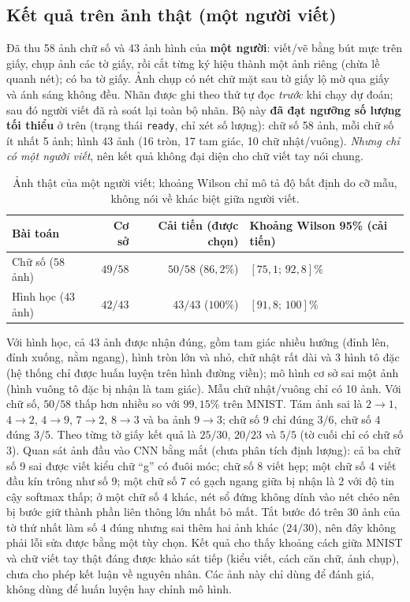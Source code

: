 \subsection{Kết quả trên ảnh thật (một người viết)}
Đã thu 58 ảnh chữ số và 43 ảnh hình của \textbf{một người}: viết/vẽ bằng bút mực trên giấy, chụp ảnh các tờ giấy, rồi cắt từng ký hiệu thành một ảnh riêng
(chừa lề quanh nét); có ba tờ giấy. Ảnh chụp có nét chữ mặt sau tờ giấy lộ mờ qua giấy và ánh sáng không đều. Nhãn được ghi theo thứ tự đọc \emph{trước} khi chạy dự đoán; sau đó người viết đã rà soát lại toàn bộ nhãn.
Bộ này \textbf{đã đạt ngưỡng số lượng tối thiểu} ở trên (trạng thái \texttt{ready}, chỉ xét số lượng): chữ số 58 ảnh, mỗi chữ số ít nhất 5 ảnh; hình 43 ảnh (16 tròn, 17 tam giác, 10 chữ nhật/vuông).
\emph{Nhưng chỉ có một người viết}, nên kết quả không đại diện cho chữ viết tay nói chung.

\begin{table}[H]\centering
\begin{tabular}{lrrl}
\toprule
Bài toán & Cơ sở & Cải tiến (được chọn) & Khoảng Wilson 95\% (cải tiến) \\
\midrule
Chữ số ($58$ ảnh) & $49/58$ & $50/58$ ($86{,}2\%$) & $[75{,}1;\,92{,}8]\%$ \\
Hình học ($43$ ảnh) & $42/43$ & $43/43$ ($100\%$) & $[91{,}8;\,100]\%$ \\
\bottomrule
\end{tabular}
\caption{Ảnh thật của một người viết; khoảng Wilson chỉ mô tả độ bất định do cỡ mẫu, không nói về khác biệt giữa người viết.}
\end{table}

Với hình học, cả 43 ảnh được nhận đúng, gồm tam giác nhiều hướng (đỉnh lên, đỉnh xuống, nằm ngang), hình tròn lớn và nhỏ, chữ nhật rất dài và 3 hình tô đặc (hệ thống chỉ được huấn luyện trên hình đường viền);
mô hình cơ sở sai một ảnh (hình vuông tô đặc bị nhận là tam giác). Mẫu chữ nhật/vuông chỉ có 10 ảnh.
Với chữ số, $50/58$ thấp hơn nhiều so với $99{,}15\%$ trên MNIST. Tám ảnh sai là $2\to1$, $4\to2$, $4\to9$, $7\to2$, $8\to3$ và ba ảnh $9\to3$; chữ số 9 chỉ đúng $3/6$, chữ số 4 đúng $3/5$.
Theo từng tờ giấy kết quả là $25/30$, $20/23$ và $5/5$ (tờ cuối chỉ có chữ số 3). Quan sát ảnh đầu vào CNN bằng mắt (chưa phân tích định lượng):
cả ba chữ số 9 sai được viết kiểu chữ ``g'' có đuôi móc; chữ số 8 viết hẹp; một chữ số 4 viết đầu kín trông như số 9; một chữ số 7 có gạch ngang giữa bị nhận là 2 với độ tin cậy softmax thấp; ở một chữ số 4 khác,
nét sổ đứng không dính vào nét chéo nên bị bước giữ thành phần liên thông lớn nhất bỏ mất.
Tắt bước đó trên 30 ảnh của tờ thứ nhất làm số 4 đúng nhưng sai thêm hai ảnh khác ($24/30$), nên đây không phải lỗi sửa được bằng một tùy chọn.
Kết quả cho thấy khoảng cách giữa MNIST và chữ viết tay thật đáng được khảo sát tiếp (kiểu viết, cách căn chữ, ảnh chụp), chưa cho phép kết luận về nguyên nhân.
Các ảnh này chỉ dùng để đánh giá, không dùng để huấn luyện hay chỉnh mô hình.

